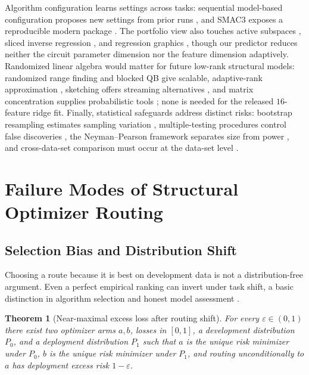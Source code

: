 \documentclass[aps,prx,reprint,superscriptaddress,floatfix]{revtex4-2}
\newtheorem{theorem}{Theorem}[section]
\begin{document}
Algorithm configuration learns settings across tasks: sequential model-based
configuration proposes new settings from prior runs \citep{hutter2011sequential},
and SMAC3 exposes a reproducible modern package \citep{lindauer2022smac3}.  The
portfolio view also touches active subspaces \citep{constantine2015active},
sliced inverse regression \citep{li1991sliced}, and regression graphics
\citep{cook1998regression}, though our predictor reduces neither the circuit
parameter dimension nor the feature dimension adaptively.  Randomized linear
algebra would matter for future low-rank structural models: randomized range
finding and blocked QB give scalable, adaptive-rank approximation
\citep{halko2011finding,yu2018randqb}, sketching offers streaming alternatives
\citep{woodruff2014sketching,liberty2013simple}, and matrix concentration
supplies probabilistic tools \citep{tropp2015matrix}; none is needed for the
released $16$-feature ridge fit.  Finally, statistical safeguards address
distinct risks: bootstrap resampling estimates sampling variation
\citep{efron1993bootstrap}, multiple-testing procedures control false discoveries
\citep{benjamini1995controlling}, the Neyman--Pearson framework separates size
from power \citep{neyman1933efficient}, and cross-data-set comparison must occur
at the data-set level \citep{demsar2006statistical}.

\section{Failure Modes of Structural Optimizer Routing}

\subsection{Selection Bias and Distribution Shift}

Choosing a route because it is best on development data is not a
distribution-free argument.  Even a perfect empirical ranking can invert under
task shift, a basic distinction in algorithm selection and honest model
assessment \citep{rice1976selection,cawley2010overfitting}.

\begin{theorem}[Near-maximal excess loss after routing shift]
\label{thm:shift}
For every $\varepsilon\in(0,1)$ there exist two optimizer arms $a,b$, losses in
$[0,1]$, a development distribution $P_0$, and a deployment distribution $P_1$
such that $a$ is the unique risk minimizer under $P_0$, $b$ is the unique risk
minimizer under $P_1$, and routing unconditionally to $a$ has deployment excess
risk $1-\varepsilon$.
\end{theorem}
\end{document}
